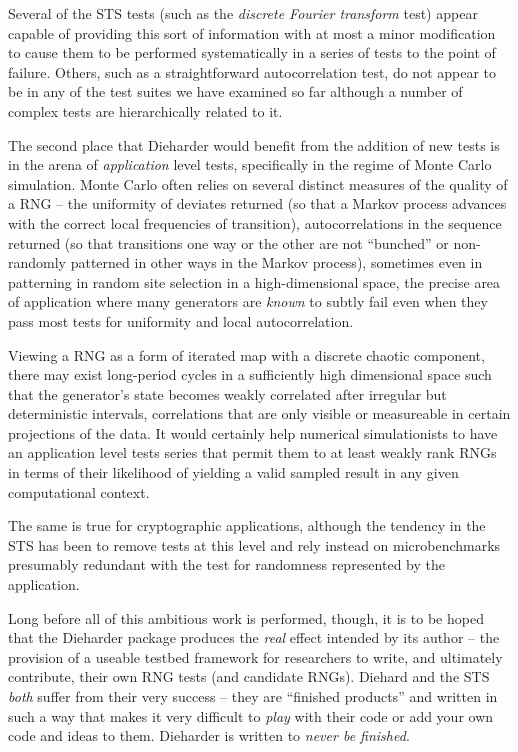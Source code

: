 \documentclass{book}
\begin{document}
Several of the STS tests (such as the {\em discrete Fourier transform}
test) appear capable of providing this sort of information with at most
a minor modification to cause them to be performed systematically in a
series of tests to the point of failure.  Others, such as a
straightforward autocorrelation test, do not appear to be in any of the
test suites we have examined so far although a number of complex tests
are hierarchically related to it.

The second place that Dieharder would benefit from the addition of new
tests is in the arena of {\em application} level tests, specifically in
the regime of Monte Carlo simulation.  Monte Carlo often relies on
several distinct measures of the quality of a RNG -- the uniformity of
deviates returned (so that a Markov process advances with the correct
local frequencies of transition), autocorrelations in the sequence
returned (so that transitions one way or the other are not ``bunched''
or non-randomly patterned in other ways in the Markov process),
sometimes even in patterning in random site selection in a
high-dimensional space, the precise area of application where many
generators are {\em known} to subtly fail even when they pass most tests
for uniformity and local autocorrelation.  

Viewing a RNG as a form of iterated map with a discrete chaotic
component, there may exist long-period cycles in a sufficiently high
dimensional space such that the generator's state becomes weakly
correlated after irregular but deterministic intervals, correlations
that are only visible or measureable in certain projections of the data.
It would certainly help numerical simulationists to have an application
level tests series that permit them to at least weakly rank RNGs in
terms of their likelihood of yielding a valid sampled result in any
given computational context.

The same is true for cryptographic applications, although the tendency
in the STS has been to remove tests at this level and rely instead on
microbenchmarks presumably redundant with the test for randomness
represented by the application.

Long before all of this ambitious work is performed, though, it is to be
hoped that the Dieharder package produces the {\em real} effect intended
by its author -- the provision of a useable testbed framework for
researchers to write, and ultimately contribute, their own RNG tests
(and candidate RNGs).  Diehard and the STS {\em both} suffer from their
very success -- they are ``finished products'' and written in such a way
that makes it very difficult to {\em play} with their code or add your
own code and ideas to them.  Dieharder is written to {\em never be
finished}.  
\end{document}
